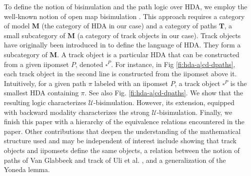 \documentclass[11pt,a4paper,oldfontcommands]{memoir}
\newcommand{\TrO}{\mathbf{T}}
\begin{document}
To define the notion of bisimulation and the path logic over HDA, we employ the well-known notion of open map bisimulation \cite{JOYAL1996164}. This approach requires a category of model $\mathbf{M}$ (the category of HDA in our case) and a category of paths $\TrO$, a small subcategory of $\mathbf{M}$ (a category of track objects in our case). Track objects have originally been introduced in \cite{LanguageofHDA} to define the language of HDA. They form a subcategory of $\mathbf{M}$. A track object is a particular HDA that can be constructed from a given iipomset $P$, denoted $\square^P$. For instance, in Fig \ref{fi:hda-a|cd-dpaths}, each track object in the second line is constructed from the iipomset above it. Intuitively, for a given path $\pi$ labeled with an iipomset $P$, a track object $\square^P$ is the smallest HDA containing $\pi$. See also Fig. \ref{fi:hda-a|cd-dpaths}. We show that the resulting logic characterizes $\mathcal{U}$-bisimulation. However, its extension, equipped with backward modality characterizes the strong $\mathcal{U}$-bisimulation. Finally, we finish this paper with a hierarchy of the equivalence relations encountered in the paper. Other contributions that deepen the understanding of the mathematical structure used and may be independent of interest include showing that track objects and iipomsets define the same objects, a relation between the notion of paths of Van Glabbeek \cite{VANGLABBEEK2006265} and track of Uli et al. \cite{LanguageofHDA}, and a generalization of the Yoneda lemma.
 
\end{document}
